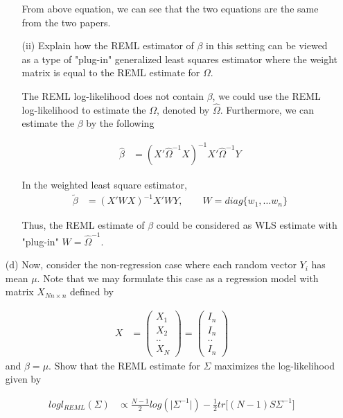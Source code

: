 \begin{itemize}
\begin{itemize}
From above equation, we can see that the two equations are the same from the two papers.

\item[(ii)] Explain how the REML estimator of $\beta$ in this setting can be viewed as a type of "plug-in" generalized least squares estimator where the weight matrix is equal to the REML estimate for $\Omega$.

The REML log-likelihood does not contain $\beta$, we could use the REML log-likelihood to estimate the $\Omega$, denoted by $\hat{\Omega}$. Furthermore, we can estimate the $\beta$ by the following

 \begin{align*}
\hat{\beta} &= (X' \hat{\Omega}^{-1}X)^{-1} X' \hat{\Omega}^{-1} Y 
\end{align*}

In the weighted least square estimator, 
 \begin{align*}
\tilde{\beta} &= (X' W X)^{-1} X' W Y , \qquad W= diag\{ w_1, …w_n\}
\end{align*}

Thus, the REML estimate of $\beta$ could be considered as WLS estimate with "plug-in" $W = \hat{\Omega}^{-1}$.
\end{itemize}

\item[(d)] Now, consider the non-regression case where each random vector $Y_i$ has mean $\mu$. Note that we may formulate this case as a regression model with matrix $X_{N n \times n}$ defined by

 \begin{align*}
X &= \begin{pmatrix}
X_1 \\
X_2 \\
.. \\
X_N
\end{pmatrix} = \begin{pmatrix}
I_n \\
I_n \\
.. \\
I_n
\end{pmatrix}
\end{align*}
and $\beta = \mu$. Show that the REML estimate for $\Sigma$ maximizes the log-likelihood given by

\begin{align*}
log l_{REML} (\Sigma) & \propto \frac{N-1}{2} log(\vert \Sigma^{-1} \vert) - \frac{1}{2} tr \Big[ (N-1) S \Sigma^{-1} \Big]
\end{align*}


\end{itemize}
